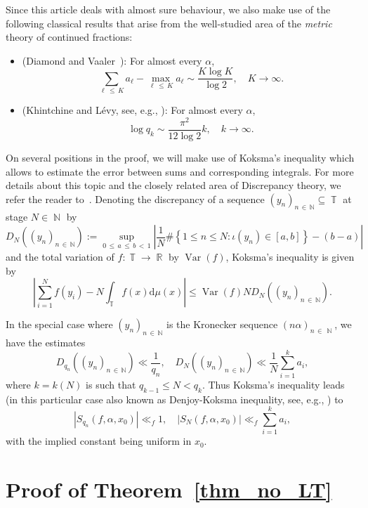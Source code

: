 \documentclass[AHL,Unicode,longabstracts,published]{cedram}
\DeclareMathOperator{\R}{\mathbb{R}}
\DeclareMathOperator{\N}{\mathbb{N}}
\DeclareMathOperator{\T}{\mathbb{T}}
\DeclareMathOperator{\Var}{Var}
\newcommand{\rmd}{\mathrm{d}}
\newcommand{\yn}{(y_n)_{n\,\in\,\mathbb{N}} }
\begin{document}
Since this article deals with almost sure behaviour, we also make use of the following classical results that arise from the well-studied area of the \emph{metric} theory of continued fractions:
\begin{itemize}
\item (Diamond and Vaaler~\cite{diamond_vaaler}): For almost every $\alpha$,
\begin{equation}\label{Eq_trimmed_sum}
\sum_{\ell\,\leq\,K} a_{\ell} - \max\limits_{\ell\,\leq\,K} a_{\ell} \sim \frac{K \log K}{\log 2}, \quad K \to \infty.
\end{equation}
\item (Khintchine and Lévy, see, e.g., \cite[Chapter~5, \S9, Theorem~1]{rock_sz}): For almost every $\alpha$,
\begin{equation}\label{Eq_size_of_q_k}
\log q_k \sim \frac{\pi^2}{12 \log 2} k, \quad k \to \infty.
\end{equation}
\end{itemize}

On several positions in the proof, we will make use of Koksma's inequality which allows to estimate the error between sums and corresponding integrals. For more details about this topic and the closely related area of Discrepancy theory, we refer the reader to~\cite{kuipers}. Denoting the discrepancy of a sequence $\yn \subseteq \T$ at stage $N \in \N$ by
\[
D_N(\yn) := \sup\limits_{0\,\leq\,a\,\leq\,b\,<\,1} \left | \frac{1}{N}\#\left\{1 \leq n \leq N: \iota(y_n) \in [a,b]\right\} - (b-a) \right |
\]
and the total variation of $f: \T \to \R$ by $\Var(f)$, Koksma's inequality is given by
\[
\left| \sum_{i=1}^{N} f(y_i) - N\int_{\T} f(x) \rmd \mu(x) \right| \leq \Var(f)N D_N(\yn).
\]

In the special case where $\yn$ is the Kronecker sequence $(n\alpha)_{n\,\in\,\N}$, we have the estimates
\[
D_{q_n}(\yn) \ll \frac{1}{q_n}, \quad D_{N}(\yn) \ll \frac{1}{N}\sum_{i=1}^{k} a_i,
\]
where $k = k(N)$ is such that $q_{k-1} \leq N < q_{k}$. Thus Koksma's inequality leads (in this particular case also known as Denjoy-Koksma inequality, see, e.g., \cite{herman}) to
\begin{equation}\label{denj_koks}
\left | S_{q_n}(f, \alpha, x_0) \right |
\ll_f 1, \quad
\left | S_{N}(f, \alpha, x_0) \right | \ll_f \sum_{i=1}^{k} a_i,
\end{equation}
with the implied constant being uniform in $x_0$.



\section{Proof of Theorem~\ref{thm_no_LT}}\label{Sect_Pf_noCLT}
\end{document}
